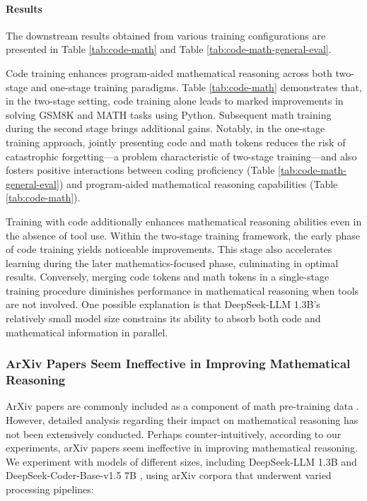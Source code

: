 \begin{itemize}[topsep=0pt]
\begin{itemize}[topsep=0pt]
\paragraph{Results}
The downstream results obtained from various training configurations are presented in Table \ref{tab:code-math} and Table \ref{tab:code-math-general-eval}.

Code training enhances program-aided mathematical reasoning across both two-stage and one-stage training paradigms. Table \ref{tab:code-math} demonstrates that, in the two-stage setting, code training alone leads to marked improvements in solving GSM8K and MATH tasks using Python. Subsequent math training during the second stage brings additional gains. Notably, in the one-stage training approach, jointly presenting code and math tokens reduces the risk of catastrophic forgetting—a problem characteristic of two-stage training—and also fosters positive interactions between coding proficiency (Table \ref{tab:code-math-general-eval}) and program-aided mathematical reasoning capabilities (Table \ref{tab:code-math}).

Training with code additionally enhances mathematical reasoning abilities even in the absence of tool use. Within the two-stage training framework, the early phase of code training yields noticeable improvements. This stage also accelerates learning during the later mathematics-focused phase, culminating in optimal results. Conversely, merging code tokens and math tokens in a single-stage training procedure diminishes performance in mathematical reasoning when tools are not involved. One possible explanation is that DeepSeek-LLM 1.3B's relatively small model size constrains its ability to absorb both code and mathematical information in parallel.

\subsubsection{ArXiv Papers Seem Ineffective in Improving Mathematical Reasoning}

ArXiv papers are commonly included as a component of math pre-training data \citep{minerva,gpt-f,llemma,mathpile}. However, detailed analysis regarding their impact on mathematical reasoning has not been extensively conducted. Perhaps counter-intuitively, according to our experiments, arXiv papers seem ineffective in improving mathematical reasoning. We experiment with models of different sizes, including DeepSeek-LLM 1.3B and DeepSeek-Coder-Base-v1.5 7B \citep{deepseek-coder}, using arXiv corpora that underwent varied processing pipelines:


\end{itemize}
\end{itemize}
